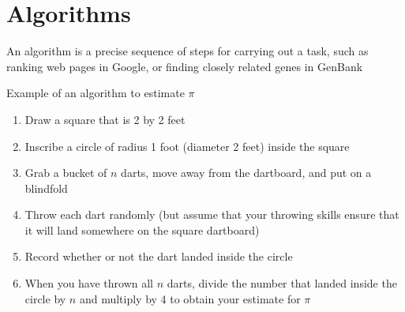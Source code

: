 \documentclass[8pt,a4paper,compress]{beamer}
\begin{document}
\section{Algorithms}
\begin{frame}[fragile]
\pause

An algorithm is a precise sequence of steps for carrying out a task, such as ranking web pages in Google, or finding closely related genes in GenBank

\pause
\bigskip

Example of an algorithm to estimate $\pi$

\begin{enumerate}
\item Draw a square that is 2 by 2 feet
\item Inscribe a circle of radius 1 foot (diameter 2 feet) inside the square
\item Grab a bucket of $n$ darts, move away from the dartboard, and put on a blindfold
\item Throw each dart randomly (but assume that your throwing skills ensure that it will land somewhere on the square dartboard)
\item Record whether or not the dart landed inside the circle
\item When you have thrown all $n$ darts, divide the number that landed inside the circle by $n$ and multiply by 4 to obtain your estimate for $\pi$
\end{enumerate}
\end{frame}
\end{document}
